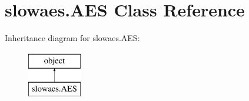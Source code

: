 \hypertarget{classslowaes_1_1_a_e_s}{\section{slowaes.\-A\-E\-S Class Reference}
\label{classslowaes_1_1_a_e_s}
}
Inheritance diagram for slowaes.\-A\-E\-S\-:\begin{figure}[H]
\begin{center}
\leavevmode
\includegraphics[height=2.000000cm]{classslowaes_1_1_a_e_s}
\end{center}
\end{figure}
